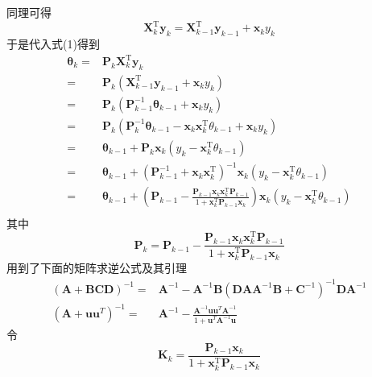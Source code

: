 同理可得
\begin{equation*}
    \mathbf{X}_k^\mathrm{T}\boldsymbol{y}_k
    =\mathbf{X}_{k-1}^\mathrm{T}\boldsymbol{y}_{k-1}
    +\boldsymbol{x}_ky_k
\end{equation*}
于是代入式(1)得到
\begin{align*}
\boldsymbol{\theta}_k =& \mathbf{P}_k\mathbf{X}_k^\mathrm{T}\boldsymbol{y}_k \\
=& \mathbf{P}_k(\mathbf{X}_{k-1}^\mathrm{T}\boldsymbol{y}_{k-1}
 +\boldsymbol{x}_ky_k) \\
=& \mathbf{P}_k(\mathbf{P}_{k-1}^{-1}\boldsymbol{\theta}_{k-1}
 +\boldsymbol{x}_ky_k) \\
=& \mathbf{P}_k(\mathbf{P}_k^{-1}\boldsymbol{\theta}_{k-1}
 -\boldsymbol{x}_k\boldsymbol{x}_k^\mathrm{T}\theta_{k-1}+\boldsymbol{x}_ky_k) \\
=& \boldsymbol{\theta}_{k-1} + \mathbf{P}_k\boldsymbol{x}_k
 (y_k-\boldsymbol{x}_k^\mathrm{T}\theta_{k-1}) \\
=& \boldsymbol{\theta}_{k-1}
 +(\mathbf{P}_{k-1}^{-1} + \boldsymbol{x}_k\boldsymbol{x}_k^\mathrm{T})^{-1}
 \boldsymbol{x}_k(y_k-\boldsymbol{x}_k^\mathrm{T}\theta_{k-1}) \\
=& \boldsymbol{\theta}_{k-1}
 +(\mathbf{P}_{k-1}-\frac{\mathbf{P}_{k-1}\boldsymbol{x}_k\boldsymbol{x}_k^\mathrm{T}
 \mathbf{P}_{k-1}}{1+\boldsymbol{x}_k^\mathrm{T}\mathbf{P}_{k-1}\boldsymbol{x}_k})
 \boldsymbol{x}_k(y_k-\boldsymbol{x}_k^\mathrm{T}\theta_{k-1}) \\
\end{align*}
其中
\begin{equation*}
    \mathbf{P}_k =
 \mathbf{P}_{k-1}-\frac{\mathbf{P}_{k-1}\boldsymbol{x}_k\boldsymbol{x}_k^\mathrm{T}
 \mathbf{P}_{k-1}}{1+\boldsymbol{x}_k^\mathrm{T}\mathbf{P}_{k-1}\boldsymbol{x}_k}
\end{equation*}
用到了下面的矩阵求逆公式及其引理
\begin{align*}
(\mathbf{A}+\mathbf{B C D})^{-1} =& \mathbf{A}^{-1}-\mathbf{A}^{-1} \mathbf{B}
(\mathbf{D A} \mathbf{A}^{-1} \mathbf{B}+\mathbf{C}^{-1})^{-1} \mathbf{D A}^{-1} \\
(\mathbf{A}+\mathbf{u} \mathbf{u}^{T})^{-1} =& \mathbf{A}^{-1}
 -\frac{\mathbf{A}^{-1} \mathbf{u} \mathbf{u}^{T} \mathbf{A}^{-1}}
 {1+\mathbf{u}^{T} \mathbf{A}^{-1} \mathbf{u}}
\end{align*}
令
\begin{equation*}
    \mathbf{K}_k = \frac{\mathbf{P}_{k-1}\boldsymbol{x}_k}
{1+\boldsymbol{x}_k^\mathrm{T}\mathbf{P}_{k-1}\boldsymbol{x}_k}
\end{equation*}
